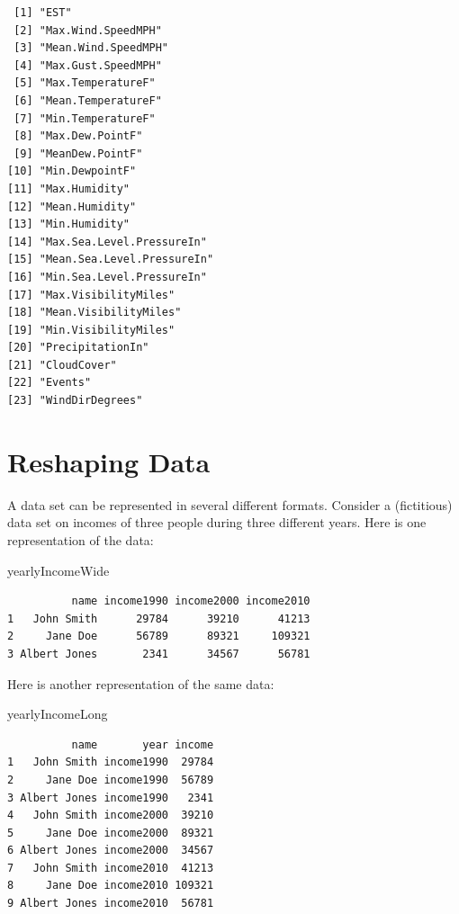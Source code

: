 \documentclass[
]{krantz}
\makeatletter
\newenvironment{Shaded}{\begin{snugshade}}{\end{snugshade}}
\newcommand{\NormalTok}[1]{#1}
\newenvironment{kframe}{%
\medskip{}
\setlength{\fboxsep}{.8em}
 \def\at@end@of@kframe{}%
 \ifinner\ifhmode%
  \def\at@end@of@kframe{\end{minipage}}%
  \begin{minipage}{\columnwidth}%
 \fi\fi%
 \def\FrameCommand##1{\hskip\@totalleftmargin \hskip-\fboxsep
 \colorbox{shadecolor}{##1}\hskip-\fboxsep
     \hskip-\linewidth \hskip-\@totalleftmargin \hskip\columnwidth}%
 \MakeFramed {\advance\hsize-\width
   \@totalleftmargin\z@ \linewidth\hsize
   \@setminipage}}%
 {\par\unskip\endMakeFramed%
 \at@end@of@kframe}
\renewenvironment{Shaded}{\begin{kframe}}{\end{kframe}}
\makeatother
\begin{document}
\begin{verbatim}
 [1] "EST"                      
 [2] "Max.Wind.SpeedMPH"        
 [3] "Mean.Wind.SpeedMPH"       
 [4] "Max.Gust.SpeedMPH"        
 [5] "Max.TemperatureF"         
 [6] "Mean.TemperatureF"        
 [7] "Min.TemperatureF"         
 [8] "Max.Dew.PointF"           
 [9] "MeanDew.PointF"           
[10] "Min.DewpointF"            
[11] "Max.Humidity"             
[12] "Mean.Humidity"            
[13] "Min.Humidity"             
[14] "Max.Sea.Level.PressureIn" 
[15] "Mean.Sea.Level.PressureIn"
[16] "Min.Sea.Level.PressureIn" 
[17] "Max.VisibilityMiles"      
[18] "Mean.VisibilityMiles"     
[19] "Min.VisibilityMiles"      
[20] "PrecipitationIn"          
[21] "CloudCover"               
[22] "Events"                   
[23] "WindDirDegrees"           
\end{verbatim}

\hypertarget{reshaping-data}{%
\section{Reshaping Data}\label{reshaping-data}}

A data set can be represented in several different formats. Consider a (fictitious) data set on incomes of three people during three different years. Here is one representation of the data:

\begin{Shaded}
\begin{Highlighting}[]
\NormalTok{yearlyIncomeWide}
\end{Highlighting}
\end{Shaded}

\begin{verbatim}
          name income1990 income2000 income2010
1   John Smith      29784      39210      41213
2     Jane Doe      56789      89321     109321
3 Albert Jones       2341      34567      56781
\end{verbatim}

Here is another representation of the same data:

\begin{Shaded}
\begin{Highlighting}[]
\NormalTok{yearlyIncomeLong}
\end{Highlighting}
\end{Shaded}

\begin{verbatim}
          name       year income
1   John Smith income1990  29784
2     Jane Doe income1990  56789
3 Albert Jones income1990   2341
4   John Smith income2000  39210
5     Jane Doe income2000  89321
6 Albert Jones income2000  34567
7   John Smith income2010  41213
8     Jane Doe income2010 109321
9 Albert Jones income2010  56781
\end{verbatim}
\end{document}
